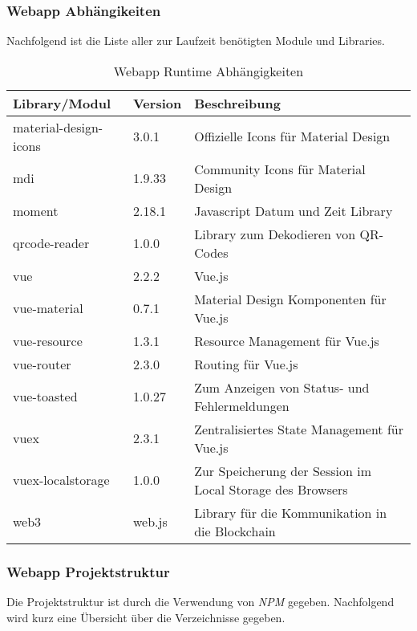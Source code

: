 \subsubsection{Webapp Abhängikeiten}
Nachfolgend ist die Liste aller zur Laufzeit benötigten Module und Libraries.

\begin{table}[H]
\centering
\caption{Webapp Runtime Abhängigkeiten}
\label{tbl:Webapp Runtime Abhängigkeiten}
\begin{tabular}{@{}lll@{}}
\toprule
Library/Modul         & Version & Beschreibung
\\ \midrule
material-design-icons & 3.0.1 & Offizielle Icons für Material Design                       \\
mdi                   & 1.9.33 & Community Icons für Material Design                       \\
moment                & 2.18.1 & Javascript Datum und Zeit Library                         \\
qrcode-reader         & 1.0.0  & Library zum Dekodieren von QR-Codes                       \\
vue                   & 2.2.2  & Vue.js                                                    \\
vue-material          & 0.7.1  & Material Design Komponenten für Vue.js                    \\
vue-resource          & 1.3.1  & Resource Management für Vue.js                            \\
vue-router            & 2.3.0  & Routing für Vue.js                                        \\
vue-toasted           & 1.0.27 & Zum Anzeigen von Status- und Fehlermeldungen              \\
vuex                  & 2.3.1  & Zentralisiertes State Management für Vue.js               \\
vuex-localstorage     & 1.0.0  & Zur Speicherung der Session im Local Storage des Browsers \\
web3                  & web.js & Library für die Kommunikation in die Blockchain           \\ 
\bottomrule
\end{tabular}
\end{table}


\subsubsection{Webapp Projektstruktur}
Die Projektstruktur ist durch die Verwendung von \emph{NPM} gegeben. Nachfolgend wird kurz eine Übersicht über die Verzeichnisse gegeben.

